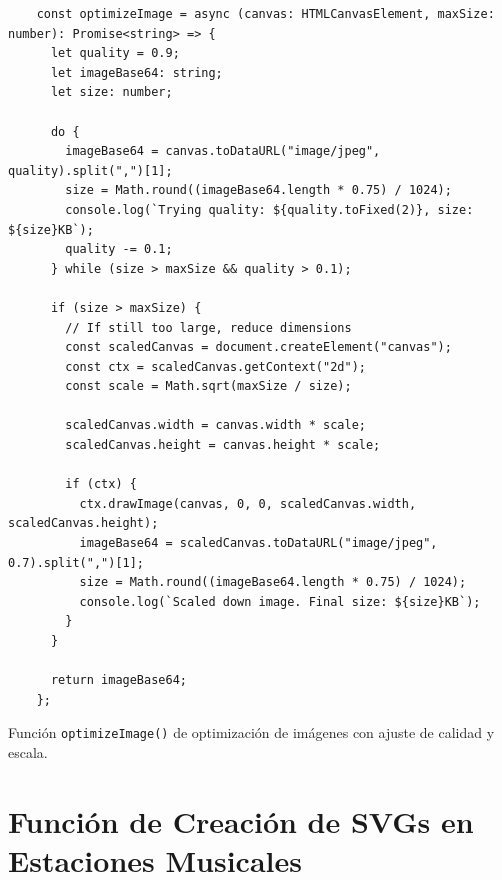 \begin{ifalgorithm}[H]
  \begin{lstlisting}
    const optimizeImage = async (canvas: HTMLCanvasElement, maxSize: number): Promise<string> => {
      let quality = 0.9;
      let imageBase64: string;
      let size: number;

      do {
        imageBase64 = canvas.toDataURL("image/jpeg", quality).split(",")[1];
        size = Math.round((imageBase64.length * 0.75) / 1024);
        console.log(`Trying quality: ${quality.toFixed(2)}, size: ${size}KB`);
        quality -= 0.1;
      } while (size > maxSize && quality > 0.1);

      if (size > maxSize) {
        // If still too large, reduce dimensions
        const scaledCanvas = document.createElement("canvas");
        const ctx = scaledCanvas.getContext("2d");
        const scale = Math.sqrt(maxSize / size);

        scaledCanvas.width = canvas.width * scale;
        scaledCanvas.height = canvas.height * scale;

        if (ctx) {
          ctx.drawImage(canvas, 0, 0, scaledCanvas.width, scaledCanvas.height);
          imageBase64 = scaledCanvas.toDataURL("image/jpeg", 0.7).split(",")[1];
          size = Math.round((imageBase64.length * 0.75) / 1024);
          console.log(`Scaled down image. Final size: ${size}KB`);
        }
      }

      return imageBase64;
    };
    \end{lstlisting}
  \caption{Función \texttt{optimizeImage()} de optimización de imágenes con ajuste de calidad y escala.}
  \label{alg:optimize_image}
\end{ifalgorithm}

\section*{Función de Creación de SVGs en Estaciones Musicales}

